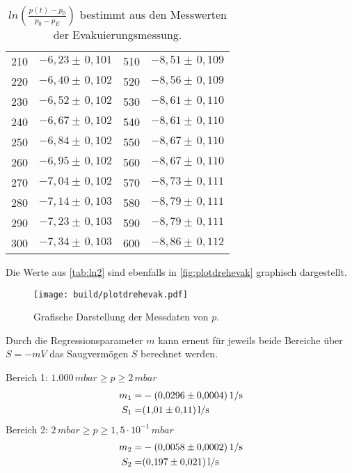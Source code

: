 \begin{table}[H]
\begin{tabular}{c|c||c|c}
  210  & $ -6,23  \pm \,  0,101 $ &  510  & $ -8,51  \pm \,  0,109 $ \\
  220  & $ -6,40  \pm \,  0,102 $ &  520  & $ -8,56  \pm \,  0,109 $ \\
  230  & $ -6,52  \pm \,  0,102 $ &  530  & $ -8,61  \pm \,  0,110 $ \\
  240  & $ -6,67  \pm \,  0,102 $ &  540  & $ -8,61  \pm \,  0,110 $ \\
  250  & $ -6,84  \pm \,  0,102 $ &  550  & $ -8,67  \pm \,  0,110 $ \\
  260  & $ -6,95  \pm \,  0,102 $ &  560  & $ -8,67  \pm \,  0,110 $ \\
  270  & $ -7,04  \pm \,  0,102 $ &  570  & $ -8,73  \pm \,  0,111 $ \\
  280  & $ -7,14  \pm \,  0,103 $ &  580  & $ -8,79  \pm \,  0,111 $ \\
  290  & $ -7,23  \pm \,  0,103 $ &  590  & $ -8,79  \pm \,  0,111 $ \\
  300  & $ -7,34  \pm \,  0,103 $ &  600  & $ -8,86  \pm \,  0,112 $ \\
  \end{tabular}
  \caption{$ln(\frac{p(t)-p_0}{p_0 - p_E})$ bestimmt aus den Messwerten der Evakuierungsmessung.}
  \label{tab:ln2}
\end{table}
\noindent

Die Werte aus \autoref{tab:ln2} sind ebenfalls in \autoref{fig:plotdrehevak} graphisch dargestellt.

\begin{figure}[H]
  \centering
  \texttt{[image: build/plotdrehevak.pdf]}
  \caption{Grafische Darstellung der Messdaten von $p$.}
  \label{fig:plotdrehevak}
\end{figure}

\noindent
Durch die Regressionsparameter $m$ kann erneut für jeweils beide Bereiche über $S = -mV$ das Saugvermögen $S$ berechnet werden.

\noindent
Bereich 1: $1.000 \, \si{mbar} \geq p \geq 2 \, \si{mbar}$\\
\begin{align*}
	m_1=& -\SI{0,0296 \pm 0,0004}{1/s}\\
	S_1=& \SI{1,01 \pm 0,11}{l/s}
\end{align*}
Bereich 2: $2 \, \si{mbar} \geq p \geq 1,5 \cdot 10^{-1} \, \si{mbar}$\\
\begin{align*}
	m_2=& -\SI{0,0058 \pm 0,0002}{1/s}\\
	S_2=& \SI{0,197 \pm 0,021}{l/s}
\end{align*}